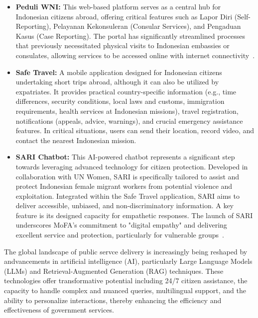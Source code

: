 \documentclass[12pt]{report}
\begin{document}
\begin{itemize}
    \item \textbf{Peduli WNI:} This web-based platform serves as a central hub for Indonesian citizens abroad, offering critical features such as Lapor Diri (Self-Reporting), Pelayanan Kekonsuleran (Consular Services), and Pengaduan Kasus (Case Reporting). The portal has significantly streamlined processes that previously necessitated physical visits to Indonesian embassies or consulates, allowing services to be accessed online with internet connectivity~\cite{PeduliWNI}.
    \item \textbf{Safe Travel:} A mobile application designed for Indonesian citizens undertaking short trips abroad, although it can also be utilized by expatriates. It provides practical country-specific information (e.g., time differences, security conditions, local laws and customs, immigration requirements, health services at Indonesian missions), travel registration, notifications (appeals, advice, warnings), and crucial emergency assistance features. In critical situations, users can send their location, record video, and contact the nearest Indonesian mission.
    \item \textbf{SARI Chatbot:} This AI-powered chatbot represents a significant step towards leveraging advanced technology for citizen protection. Developed in collaboration with UN Women, SARI is specifically tailored to assist and protect Indonesian female migrant workers from potential violence and exploitation. Integrated within the Safe Travel application, SARI aims to deliver accessible, unbiased, and non-discriminatory information. A key feature is its designed capacity for empathetic responses. The launch of SARI underscores MoFA's commitment to "digital empathy" and delivering excellent service and protection, particularly for vulnerable groups~\cite{kemlu2025chatbot}.
\end{itemize}

The global landscape of public servce delivery is increasingly being reshaped by andvancements in artificial intelligence (AI), particularly Large Language Models (LLMs) and Retrieval-Augmented Generation (RAG) techniques. These technologies offer transformative potential including 24/7 citizen assistance, the capacity to handle complex and nuanced queries, multilingual support, and the ability to personalize interactions, thereby enhancing the efficiency and effectiveness of government services.
\end{document}
